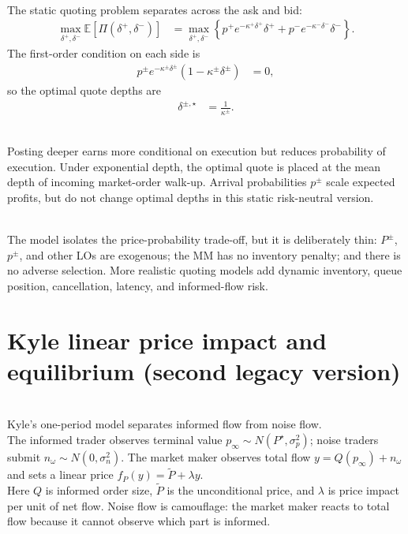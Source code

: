 \documentclass[a4paper,oneside,openany]{book}
\begin{document}
\begin{model}
\par\smallskip\noindent{}\\
The static quoting problem separates across the ask and bid:
\begin{align*}
\max_{\delta^+,\delta^-}\mathbb{E}\left[\Pi(\delta^+,\delta^-)\right]
&=\max_{\delta^+,\delta^-}\left\{p^+e^{-\kappa^+\delta^+}\delta^+ + p^-e^{-\kappa^-\delta^-}\delta^-\right\}.
\end{align*}
The first-order condition on each side is
\begin{align*}
p^\pm e^{-\kappa^\pm\delta^\pm}(1-\kappa^\pm\delta^\pm)&=0,
\end{align*}
so the optimal quote depths are
\begin{align*}
\delta^{\pm,\star}&=\frac{1}{\kappa^\pm}.
\end{align*}

\par\smallskip\noindent{}\\
Posting deeper earns more conditional on execution but reduces probability of execution. Under exponential depth, the optimal quote is placed at the mean depth of incoming market-order walk-up. Arrival probabilities $p^\pm$ scale expected profits, but do not change optimal depths in this static risk-neutral version.

\par\smallskip\noindent{}\\
The model isolates the price-probability trade-off, but it is deliberately thin: $P^\pm$, $p^\pm$, and other LOs are exogenous; the MM has no inventory penalty; and there is no adverse selection. More realistic quoting models add dynamic inventory, queue position, cancellation, latency, and informed-flow risk.
\end{model}

\section*{Kyle linear price impact and equilibrium (second legacy version)}

\begin{model} \\
Kyle's one-period model separates informed flow from noise flow.\\
The informed trader observes terminal value $p_\infty\sim N(P^\star,\sigma_p^2)$; noise traders submit $n_\omega\sim N(0,\sigma_n^2)$. The market maker observes total flow $y=Q(p_\infty)+n_\omega$ and sets a linear price $f_P(y)=\tilde{P}+\lambda y$.\\
Here $Q$ is informed order size, $\tilde{P}$ is the unconditional price, and $\lambda$ is price impact per unit of net flow. Noise flow is camouflage: the market maker reacts to total flow because it cannot observe which part is informed.
\end{model}
\end{document}

